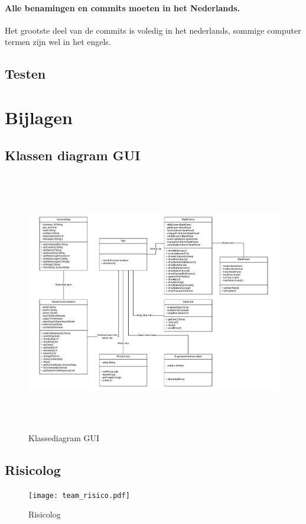 \documentclass{article}
\begin{document}
\paragraph{Alle benamingen en commits moeten in het Nederlands.}
Het grootste deel van de commits is voledig in het nederlands, sommige computer termen zijn wel in het engels.

\subsection{Testen}


\newpage
\section{Bijlagen}

\subsection{Klassen diagram GUI}
\begin{figure}[H]
       \centering
       \includegraphics[height=4.5in]{Klassediagram.pdf}
       \caption{Klassediagram GUI}
       \label{fig: Klassediagram GUI}
\end{figure}

\subsection{Risicolog}
\begin{figure}[H]
	\centering
	\texttt{[image: team\_risico.pdf]}
	\caption{Risicolog}
	\label{fig: Team Risicolog}
\end{figure}
\end{document}

